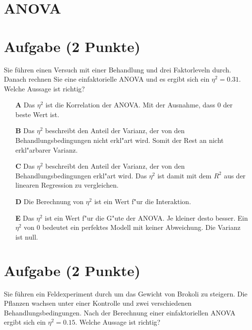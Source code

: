 \documentclass[a4paper, 9pt]{scrartcl}\usepackage[]{graphicx}\usepackage[]{xcolor}
\begin{document}
\section*{ANOVA}

\section{Aufgabe \hfill (2 Punkte)}





Sie führen einen Versuch mit einer Behandlung und drei Faktorleveln durch. Danach rechnen Sie eine einfaktorielle ANOVA und es ergibt sich ein $\eta^2 = 0.31$. Welche Aussage ist richtig?



\begin{enumerate}
\item [\textbf{A} \msquare] Das $\eta^2$ ist die Korrelation der ANOVA. Mit der Ausnahme, dass 0 der beste Wert ist.
\item [\textbf{B} \msquare] Das $\eta^2$ beschreibt den Anteil der Varianz, der von den Behandlungsbedingungen nicht erkl{"a}rt wird. Somit der Rest an nicht erkl{"a}rbarer Varianz.
\item [\textbf{C} \msquare] Das $\eta^2$ beschreibt den Anteil der Varianz, der von den Behandlungsbedingungen erkl{"a}rt wird. Das $\eta^2$ ist damit mit dem $R^2$ aus der linearen Regression zu vergleichen.
\item [\textbf{D} \msquare] Die Berechnung von $\eta^2$ ist ein Wert f{"u}r die Interaktion.
\item [\textbf{E} \msquare] Das $\eta^2$ ist ein Wert f{"u}r die G{"u}te der ANOVA. Je kleiner desto besser. Ein $\eta^2$ von 0 bedeutet ein perfektes Modell mit keiner Abweichung. Die Varianz ist null.
\end{enumerate} 

\section{Aufgabe \hfill (2 Punkte)}



Sie führen ein Feldexperiment durch um das Gewicht von Brokoli zu
steigern. Die Pflanzen wachsen unter einer Kontrolle und zwei verschiedenen
Behandlungsbedingungen. Nach der Berechnung einer einfaktoriellen ANOVA
ergibt sich ein $\eta^2 = 0.15$. Welche Aussage ist richtig?
\end{document}
